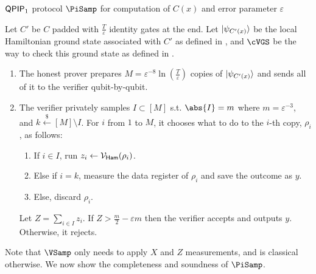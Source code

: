 \begin{protocol}{$\operatorname{\mathsf{QPIP}}_1$ protocol $\PiSamp$ for computation of $C(x)$ and error parameter $\varepsilon$}\label{ProtoQPIP1}

	Let $C'$ be $C$ padded with $\frac{T}{\varepsilon}$ identity gates at the end.
	Let $\ket{\psi_{C'(x)}}$ be the local Hamiltonian ground state associated with $C'$ as defined in , and
	$\cVGS$ be the way to check this ground state as defined in .

	
	
	

	\begin{enumerate}
		\item The honest prover prepares $M=\varepsilon^{-8}\ln(\frac{T}{\varepsilon})$ copies  of $\ket{\psi_{C'(x)}}$ and sends all of it to the verifier qubit-by-qubit.
		\item The verifier privately samples $I\subset[M]$ s.t. $\abs{I}=m$ where $m=\varepsilon^{-3}$, and $k\xleftarrow{\$}[M]\setminus I$.
			For $i$ from $1$ to $M$, it chooses what to do to the $i$-th copy, $\rho_i$, as follows:
		\begin{enumerate}
			\item If $i\in I$, run $z_i\leftarrow\mathcal{V}_{\mathsf{Ham}}(\rho_i)$.
			\item Else if $i=k$, measure the data register  of $\rho_i$ and save the outcome as $y$.
			\item Else, discard $\rho_i$.
		\end{enumerate}
			Let $Z=\sum_{i\in I} z_i$. If $Z>\frac{m}{2}-\varepsilon m$ then the verifier accepts and outputs $y$. Otherwise, it rejects.
	\end{enumerate}
\end{protocol}

Note that $\VSamp$ only needs to apply $X$ and $Z$ measurements, and is classical otherwise. We now show the completeness and soundness of $\PiSamp$.


